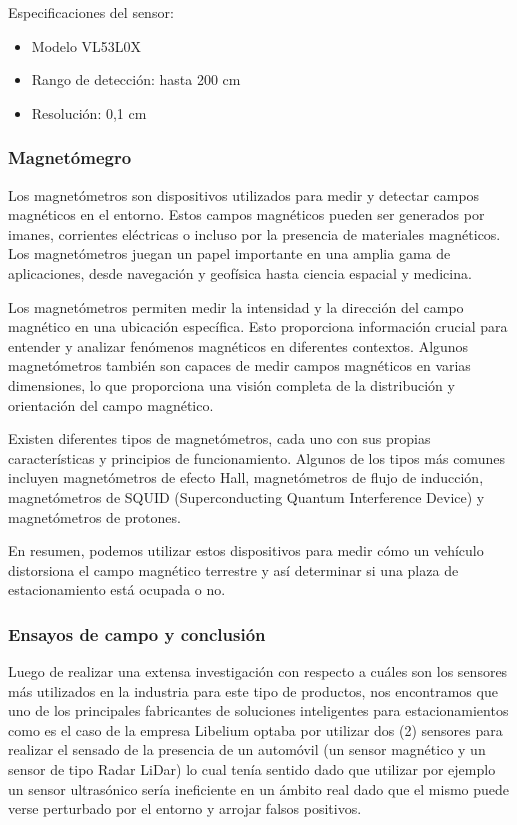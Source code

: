 Especificaciones del sensor:
\begin{itemize}
    \item Modelo VL53L0X
    \item Rango de detección: hasta 200 cm
    \item Resolución: 0,1 cm
\end{itemize}


\subsubsection{Magnetómegro}
Los magnetómetros son dispositivos utilizados para medir y detectar campos magnéticos en el entorno. Estos campos magnéticos pueden ser generados por imanes, corrientes eléctricas o incluso por la presencia de materiales magnéticos. Los magnetómetros juegan un papel importante en una amplia gama de aplicaciones, desde navegación y geofísica hasta ciencia espacial y medicina.

Los magnetómetros permiten medir la intensidad y la dirección del campo magnético en una ubicación específica. Esto proporciona información crucial para entender y analizar fenómenos magnéticos en diferentes contextos. Algunos magnetómetros también son capaces de medir campos magnéticos en varias dimensiones, lo que proporciona una visión completa de la distribución y orientación del campo magnético.

Existen diferentes tipos de magnetómetros, cada uno con sus propias características y principios de funcionamiento. Algunos de los tipos más comunes incluyen magnetómetros de efecto Hall, magnetómetros de flujo de inducción, magnetómetros de SQUID (Superconducting Quantum Interference Device) y magnetómetros de protones.

En resumen, podemos utilizar estos dispositivos para medir cómo un vehículo distorsiona el campo magnético terrestre y así determinar si una plaza de estacionamiento está ocupada o no.



\subsubsection{Ensayos de campo y conclusión}
Luego de realizar una extensa investigación con respecto a cuáles son los sensores más utilizados en la industria para este tipo de productos, nos encontramos que uno de los principales fabricantes de soluciones inteligentes para estacionamientos como es el caso de la empresa Libelium optaba por utilizar dos (2) sensores para realizar el sensado de la presencia de un automóvil (un sensor magnético y un sensor de tipo Radar LiDar) lo cual tenía sentido dado que utilizar por ejemplo un sensor ultrasónico sería ineficiente en un ámbito real dado que el mismo puede verse perturbado por el entorno y arrojar falsos positivos.

